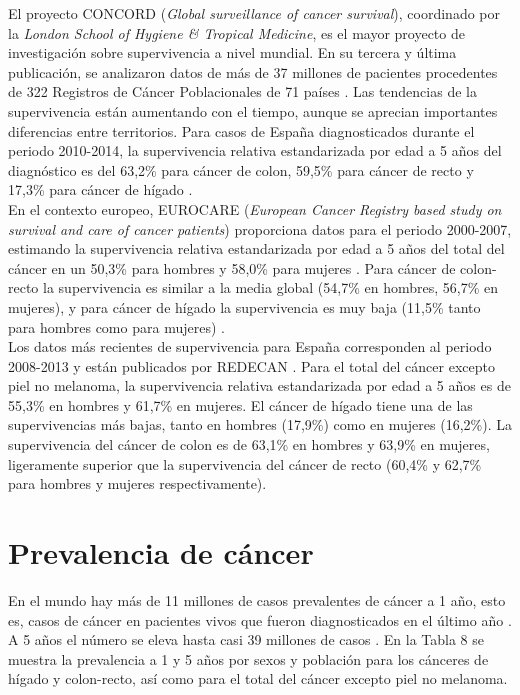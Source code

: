 El proyecto CONCORD (\textit{Global surveillance of cancer survival}), coordinado por la \textit{London School of Hygiene \& Tropical Medicine}, es el mayor proyecto de investigación sobre supervivencia a nivel mundial. En su tercera y última publicación, se analizaron datos de más de 37 millones de pacientes procedentes de 322 Registros de Cáncer Poblacionales de 71 países \cite{Allemani2018}. Las tendencias de la supervivencia están aumentando con el tiempo, aunque se aprecian importantes diferencias entre territorios. Para casos de España diagnosticados durante el periodo 2010-2014, la supervivencia relativa estandarizada por edad a 5 años del diagnóstico es del 63,2\% para cáncer de colon, 59,5\% para cáncer de recto y 17,3\% para cáncer de hígado \cite{Allemani2018}.\\

En el contexto europeo, EUROCARE (\textit{European Cancer Registry based study on survival and care of cancer patients}) proporciona datos para el periodo 2000-2007, estimando la supervivencia relativa estandarizada por edad a 5 años del total del cáncer en un 50,3\% para hombres y 58,0\% para mujeres \cite{DeAngelis2014,ECIS}. Para cáncer de colon-recto la supervivencia es similar a la media global (54,7\% en hombres, 56,7\% en mujeres), y para cáncer de hígado la supervivencia es muy baja (11,5\% tanto para hombres como para mujeres) \cite{DeAngelis2014,ECIS}.\\

Los datos más recientes de supervivencia para España corresponden al periodo 2008-2013 y están publicados por REDECAN \cite{Guevara2019}. Para el total del cáncer excepto piel no melanoma, la supervivencia relativa estandarizada por edad a 5 años es de 55,3\% en hombres y 61,7\% en mujeres. El cáncer de hígado tiene una de las supervivencias más bajas, tanto en hombres (17,9\%) como en mujeres (16,2\%). La supervivencia del cáncer de colon es de 63,1\% en hombres y 63,9\% en mujeres, ligeramente superior que la supervivencia del cáncer de recto (60,4\% y 62,7\% para hombres y mujeres respectivamente).  


\section{Prevalencia de cáncer}

En el mundo hay más de 11 millones de casos prevalentes de cáncer a 1 año, esto es, casos de cáncer en pacientes vivos que fueron diagnosticados en el último año \cite{GCO}. A 5 años el número se eleva hasta casi 39 millones de casos \cite{GCO}. En la Tabla 8 se muestra la prevalencia a 1 y 5 años por sexos y población para los cánceres de hígado y colon-recto, así como para el total del cáncer excepto piel no melanoma.\\

